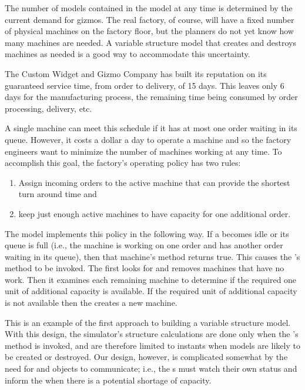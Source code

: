 The number of  models contained in the  model at any time is determined by the current demand for gizmos. The real factory, of course, will have a fixed number of physical machines on the factory floor, but the planners do not yet know how many machines are needed. A variable structure model that creates and destroys machines as needed is a good way to accommodate this uncertainty. 

The Custom Widget and Gizmo Company has built its reputation on its guaranteed service time, from order to delivery, of 15 days. This leaves only 6 days for the manufacturing process, the remaining time being consumed by order processing, delivery, etc. 

A single machine can meet this schedule if it has at most one order waiting in its queue. However, it costs a dollar a day to operate a machine and so the factory engineers want to minimize the number of machines working at any time. To accomplish this goal, the factory's operating policy has two rules:
\begin{enumerate}
\item Assign incoming orders to the active machine that can provide the shortest turn around time and
\item keep just enough active machines to have capacity for one additional order.
\end{enumerate}

The  model implements this policy in the following way. If a  becomes idle or its queue is full (i.e., the machine is working on one order and has another order waiting in its queue), then that machine's  method returns true. This causes the 's  method to be invoked. The  first looks for and removes machines that have no work. Then it examines each remaining machine to determine if the required one unit of additional capacity is available. If the required unit of additional capacity is not available then the  creates a new machine.

This is an example of the first approach to building a variable structure model. With this design, the simulator's structure calculations are done only when the 's  method is invoked, and are therefore limited to instants when  models are likely to be created or destroyed. Our design, however, is complicated somewhat by the need for  and  objects to communicate; i.e., the s must watch their own status and inform the  when there is a potential shortage of capacity.


